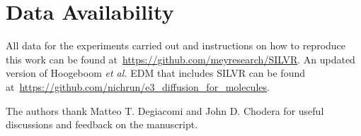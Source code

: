\documentclass[journal=jacsat,manuscript=article]{achemso}
\begin{document}
\section{Data Availability}
All data for the experiments carried out and instructions on how to reproduce this work can be found at~\url{https://github.com/meyresearch/SILVR}. An updated version of Hoogeboom \textit{et al.} EDM that includes SILVR can be found at~\url{https://github.com/nichrun/e3_diffusion_for_molecules}.

\begin{acknowledgement}
The authors thank Matteo T. Degiacomi and John D. Chodera for useful discussions and feedback on the manuscript. 
\end{acknowledgement}



%
\printbibliography
\end{document}
